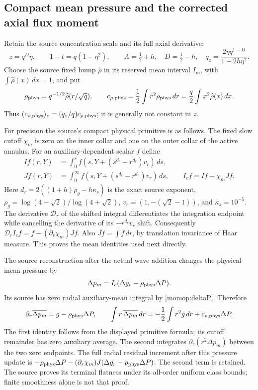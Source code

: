 \subsection{Compact mean pressure and the corrected axial flux moment}

Retain the source concentration scale and its full axial derivative:
\[
 z=q^D\eta,\qquad 1-t=q(1-\eta^2),\qquad
 A=\tfrac12+h,\quad D=\tfrac12-h,\quad
 q_z=\frac{2\eta q^{1-D}}{1-2h\eta^2}.
\]
Choose the source fixed bump $\widehat\rho$ in its reserved mean
interval $I_m$, with $\int\widehat\rho(x)\,dx=1$, and put
\[
 \rho_{\rm phys}=q^{-1/2}\widehat\rho(r/\sqrt q),\qquad
 c_{\rho,\rm phys}=\frac12\int r^2\rho_{\rm phys}\,dr
             =\frac q2\int x^2\widehat\rho(x)\,dx .
\]
Thus $(c_{\rho,\rm phys})_z=(q_z/q)c_{\rho,\rm phys}$;
it is generally not constant in $z$.

For precision the source's compact physical primitive is as follows.
The fixed slow cutoff $\chi_m$ is zero on the inner collar and one
on the outer collar of the active annulus. For an auxiliary-dependent
scalar $f$ define
\[
 \begin{split}
 I f(r,Y)&=\int_0^r
 f(s,Y+(s^{d_r}-r^{d_r})v_r)\,ds,\\
 J f(r,Y)&=\int_0^\infty
 f(s,Y+(s^{d_r}-r^{d_r})v_r)\,ds,\qquad
 I_cf=If-\chi_mJf.
 \end{split}
\]
Here $d_r=2((1+h)\rho_g-h\kappa_s)$ is the exact source exponent,
$\rho_g=\log(4-\sqrt2)/\log(4+\sqrt2)$,
$v_r=(1,-(\sqrt2-1))$, and $\kappa_s=10^{-5}$.
The derivative $\mathcal D_r$ of the shifted integral differentiates
the integration endpoint while cancelling the derivative of its
$-r^{d_r}v_r$ shift. Consequently
$\mathcal D_rI_cf=f-(\partial_r\chi_m)Jf$.
Also $\overline{Jf}=\int\overline f\,dr$, by translation invariance
of Haar measure. This proves the mean identities used next directly.

The source reconstruction after the actual wave addition changes the
physical mean pressure by
\[
 \Delta p_m=I_c(\Delta g_r-\rho_{\rm phys}\Delta P).
\]
Its source has zero radial auxiliary-mean integral by
\eqref{momop:deltaP}. Therefore
\begin{equation}\label{momop:pressureidentity}
 \partial_r\overline{\Delta p_m}
     =g-\rho_{\rm phys}\Delta P,\qquad
 \int r\,\overline{\Delta p_m}\,dr
     =-\frac12\int r^2g\,dr+c_{\rho,\rm phys}\Delta P .
\end{equation}
The first identity follows from the displayed primitive formula;
its cutoff remainder has zero auxiliary average. The second integrates
$\partial_r(r^2\overline{\Delta p_m})$ between the two zero endpoints.
The full radial residual increment after this pressure update is
$-\rho_{\rm phys}\Delta P-
(\partial_r\chi_m)J(\Delta g_r-\rho_{\rm phys}\Delta P)$.
The second term is retained. The source proves its terminal flatness
under its all-order uniform class bounds; finite smoothness alone is
not that proof.

